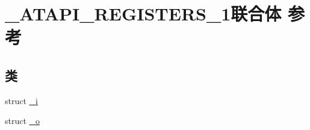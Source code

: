 \hypertarget{struct___a_t_a_p_i___r_e_g_i_s_t_e_r_s__1}{}\section{\+\_\+\+A\+T\+A\+P\+I\+\_\+\+R\+E\+G\+I\+S\+T\+E\+R\+S\+\_\+1联合体 参考}
\label{struct___a_t_a_p_i___r_e_g_i_s_t_e_r_s__1}
\subsection*{类}
\begin{DoxyCompactItemize}
\item 
struct \hyperlink{struct___a_t_a_p_i___r_e_g_i_s_t_e_r_s__1_1_1__i}{\+\_\+i}
\item 
struct \hyperlink{struct___a_t_a_p_i___r_e_g_i_s_t_e_r_s__1_1_1__o}{\+\_\+o}
\end{DoxyCompactItemize}
